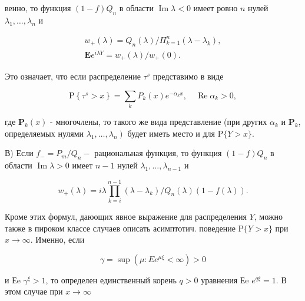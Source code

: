 \documentclass[10pt]{article}
\begin{document}
венно, то функция $(1-f) Q_{n}$ в области $\operatorname{Im} \lambda<0$ имеет ровно $n$ нулей $\lambda_{1}, \ldots, \lambda_{n}$ и



\[

\begin{gathered}

w_{+}(\lambda)=Q_{n}(\lambda) / \Pi_{k=1}^{n}\left(\lambda-\lambda_{k}\right), \\

\mathbf{E} e^{i \lambda Y}=w_{+}(\lambda) / w_{+}(0) .

\end{gathered}

\]



Это означает, что если распределение $\tau^{s}$ представимо в виде



\[

\mathrm{P}\left\{\tau^{s}>x\right\}=\sum_{k} P_{k}(x) e^{-\alpha_{k} x}, \quad \operatorname{Re} \alpha_{k}>0,

\]



где $\boldsymbol{P}_{k}(x)$ - многочлены, то такого же вида представление (при других $\alpha_{k}$ и $\boldsymbol{P}_{k}$, определяемых нулями $\left.\lambda_{1}, \ldots, \lambda_{n}\right)$ будет иметь место и для $\mathrm{P}\{Y>x\}$.



В) Если $f_{-}=P_{m} / Q_{n}-$ рациональная функция, то функция $(1-f) Q_{n}$ в области $\operatorname{Im} \lambda>0$ имеет $n-1$ нулей $\lambda_{1}, \ldots, \lambda_{n-1}$ и



\[

w_{+}(\lambda)=i \lambda \prod_{k=i}^{n-1}\left(\lambda-\lambda_{k}\right) / Q_{n}(\lambda)(1-f(\lambda)) .

\]



Кроме этих формул, даюощих явное выражение для распределения $Y$, можно также в пироком классе случаев описать асимптотич. поведение $\mathrm{P}\{Y>x\}$ при $x \rightarrow \infty$. Именно, если



\[

\gamma=\sup \left(\mu: E e^{\mu \xi}<\infty\right)>0

\]



и Еe $\gamma^{\xi}>1$, то определен единственный корень $q>0$ уравнения Еe $e^{q \xi}=1$. В этом случае при $x \rightarrow \infty$
\end{document}
